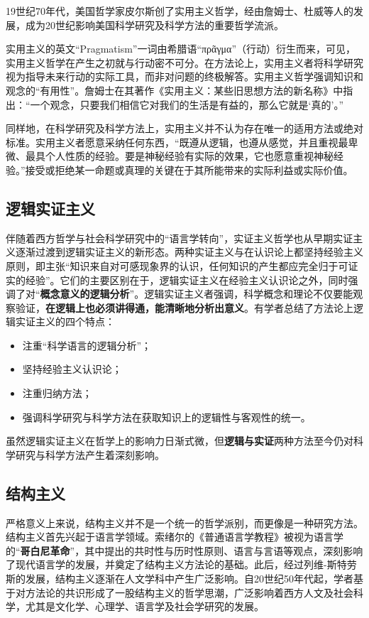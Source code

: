 19世纪70年代，美国哲学家皮尔斯创了实用主义哲学，经由詹姆士、杜威等人的发展，成为20世纪影响美国科学研究及科学方法的重要哲学流派。

实用主义的英文“Pragmatism”一词由希腊语“\textlatin{πρᾶγμα}”（行动）衍生而来，可见，实用主义哲学在产生之初就与行动密不可分。在方法论上，实用主义者将科学研究视为指导未来行动的实际工具，而非对问题的终极解答。实用主义哲学强调知识和观念的“有用性”。詹姆士在其著作《实用主义：某些旧思想方法的新名称》中指出：“一个观念，只要我们相信它对我们的生活是有益的，那么它就是`真的'。”

同样地，在科学研究及科学方法上，实用主义并不认为存在唯一的适用方法或绝对标准。实用主义者愿意采纳任何东西，“既遵从逻辑，也遵从感觉，并且重视最卑微、最具个人性质的经验。要是神秘经验有实际的效果，它也愿意重视神秘经验。”接受或拒绝某一命题或真理的关键在于其所能带来的实际利益或实际价值。

\subsection{逻辑实证主义}

伴随着西方哲学与社会科学研究中的“语言学转向”，实证主义哲学也从早期实证主义逐渐过渡到逻辑实证主义的新形态。两种实证主义与在认识论上都坚持经验主义原则，即主张“知识来自对可感现象界的认识，任何知识的产生都应完全归于可证实的经验”。它们的主要区别在于，逻辑实证主义在经验主义认识论之外，同时强调了对“\textbf{概念意义的逻辑分析}”。逻辑实证主义者强调，科学概念和理论不仅要能观察验证，\textbf{在逻辑上也必须讲得通，能清晰地分析出意义}。有学者总结了方法论上逻辑实证主义的四个特点：

\begin{itemize}
    \item 注重“科学语言的逻辑分析”；
    \item 坚持经验主义认识论；
    \item 注重归纳方法；
    \item 强调科学研究与科学方法在获取知识上的逻辑性与客观性的统一。
\end{itemize}

虽然逻辑实证主义在哲学上的影响力日渐式微，但\textbf{逻辑与实证}两种方法至今仍对科学研究与科学方法产生着深刻影响。

\subsection{结构主义}

严格意义上来说，结构主义并不是一个统一的哲学派别，而更像是一种研究方法。结构主义首先兴起于语言学领域。索绪尔的《普通语言学教程》被视为语言学的“\textbf{哥白尼革命}”，其中提出的共时性与历时性原则、语言与言语等观点，深刻影响了现代语言学的发展，并奠定了结构主义方法论的基础。此后，经过列维-斯特劳斯的发展，结构主义逐渐在人文学科中产生广泛影响。自20世纪50年代起，学者基于对方法论的共识形成了一股结构主义的哲学思潮，广泛影响着西方人文及社会科学，尤其是文化学、心理学、语言学及社会学研究的发展。

